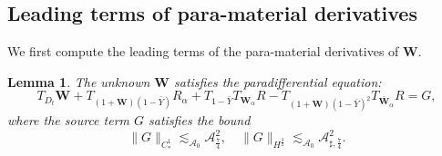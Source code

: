 \documentclass[10pt]{amsart}
\newtheorem{lemma}[theorem]{Lemma}
\theoremstyle{remark}
\theoremstyle{definition}
\numberwithin{equation}{section}
\newcommand{\f}{\frac}
\newcommand{\bw}{\mathbf{W}}
\newcommand{\CalAZ}{{\mathcal{A}_0}}
\newcommand{\ASSharp}{{\mathcal{A}_{\sharp,\frac{7}{4}}^2}}
\begin{document}
\subsection{Leading terms of para-material derivatives}
We first compute the leading terms of the para-material derivatives of $\bw$.
\begin{lemma} 
The unknown $\bw$ satisfies the paradifferential equation:
\begin{equation} \label{WParaMat}
       T_{D_t}\bw  + T_{(1+\bw)(1-\bar{Y})}R_\alpha + T_{1-\bar{Y}}T_{\bw_\alpha}R -T_{(1+\bw)(1-\bar{Y})^2}T_{\bar{\bw}_\alpha}R = G,  
\end{equation}
where the source term $G$  satisfies the bound
\begin{equation*}
 \|G\|_{C_{*}^1} \lesssim_\CalAZ \mathcal{A}^2_\f74, \quad  \|G\|_{H^\f32} \lesssim_\CalAZ \ASSharp.
\end{equation*}
\end{lemma}
\end{document}
